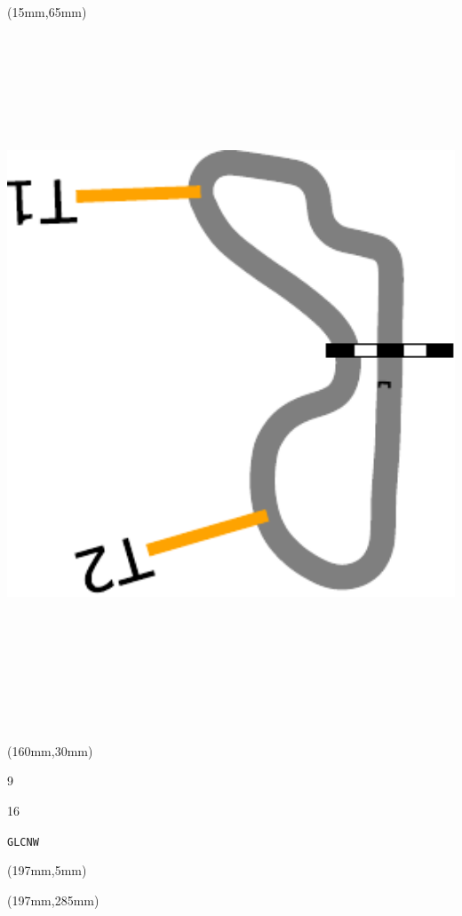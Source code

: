 \begin{textblock*}{185mm}(15mm,65mm)%
\centering
\mbox{\includegraphics[width=185mm,height=210mm,keepaspectratio]{PT/GLCNW.pdf}}
\end{textblock*}
\begin{textblock*}{40mm}(160mm,30mm)%
\Large
\par{} 
\par9 
\par16 
\par\hfill\tiny\tt GLCNW\\
\end{textblock*}
\begin{textblock*}{20mm}(197mm,5mm)%
\fbox{\thepage}
\label{GLCNW}
\end{textblock*}
\begin{textblock*}{20mm}(197mm,285mm)%
\fbox{\thepage}
\end{textblock*}

